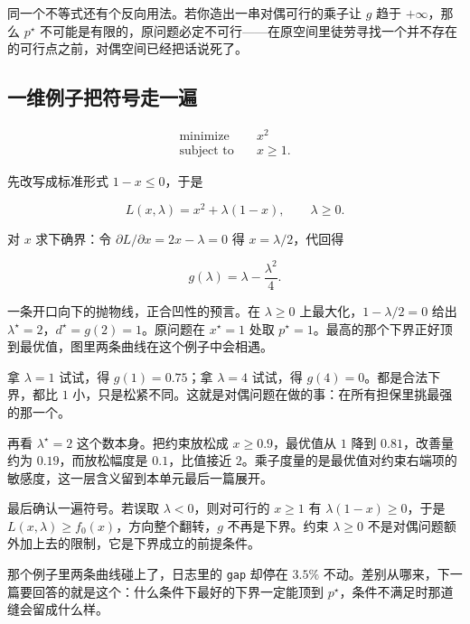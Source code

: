 同一个不等式还有个反向用法。若你造出一串对偶可行的乘子让 \(g\) 趋于 \(+\infty\)，那么 \(p^\star\) 不可能是有限的，原问题必定不可行——在原空间里徒劳寻找一个并不存在的可行点之前，对偶空间已经把话说死了。

\subsection{一维例子把符号走一遍}

\[
\begin{aligned}
\text{minimize}\quad&x^2\\
\text{subject to}\quad&x\ge1.
\end{aligned}
\]

先改写成标准形式 \(1-x\le0\)，于是

\[
L(x,\lambda)=x^2+\lambda(1-x),
\qquad\lambda\ge0.
\]

对 \(x\) 求下确界：令 \(\partial L/\partial x=2x-\lambda=0\) 得 \(x=\lambda/2\)，代回得

\[
g(\lambda)=\lambda-\frac{\lambda^2}{4}.
\]

一条开口向下的抛物线，正合凹性的预言。在 \(\lambda\ge0\) 上最大化，\(1-\lambda/2=0\) 给出 \(\lambda^\star=2\)，\(d^\star=g(2)=1\)。原问题在 \(x^\star=1\) 处取 \(p^\star=1\)。最高的那个下界正好顶到最优值，图里两条曲线在这个例子中会相遇。

拿 \(\lambda=1\) 试试，得 \(g(1)=0.75\)；拿 \(\lambda=4\) 试试，得 \(g(4)=0\)。都是合法下界，都比 \(1\) 小，只是松紧不同。这就是对偶问题在做的事：在所有担保里挑最强的那一个。

再看 \(\lambda^\star=2\) 这个数本身。把约束放松成 \(x\ge0.9\)，最优值从 \(1\) 降到 \(0.81\)，改善量约为 \(0.19\)，而放松幅度是 \(0.1\)，比值接近 \(2\)。乘子度量的是最优值对约束右端项的敏感度，这一层含义留到本单元最后一篇展开。

最后确认一遍符号。若误取 \(\lambda<0\)，则对可行的 \(x\ge1\) 有 \(\lambda(1-x)\ge0\)，于是 \(L(x,\lambda)\ge f_0(x)\)，方向整个翻转，\(g\) 不再是下界。约束 \(\lambda\ge0\) 不是对偶问题额外加上去的限制，它是下界成立的前提条件。

那个例子里两条曲线碰上了，日志里的 \texttt{gap} 却停在 \(3.5\%\) 不动。差别从哪来，下一篇要回答的就是这个：什么条件下最好的下界一定能顶到 \(p^\star\)，条件不满足时那道缝会留成什么样。
